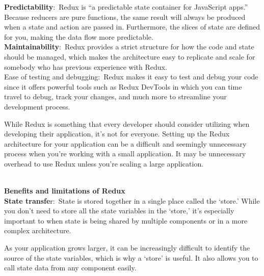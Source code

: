 \documentclass{article}
\begin{document}
\noindent \textbf{Predictability}:~Redux is ``a predictable state container for JavaScript apps.'' Because reducers are pure functions, the same result will always be produced when a state and action are passed in. Furthermore, the slices of state are defined for you, making the data flow more predictable. \\



\noindent \textbf{Maintainability}:~Redux provides a strict structure for how the code and state should be managed, which makes the architecture easy to replicate and scale for somebody who has previous experience with Redux.\\




\noindent Ease of testing and debugging:~Redux makes it easy to test and debug your code since it offers powerful tools such as Redux DevTools in which you can time travel to debug, track your changes, and much more to streamline your development process.\\


\noindent 

\noindent While Redux is something that every developer should consider utilizing when developing their application, it's not for everyone. Setting up the Redux architecture for your application can be a difficult and seemingly unnecessary process when you're working with a small application. It may be unnecessary overhead to use Redux unless you're scaling a large application.

\noindent 

\noindent 

\noindent 
\\
\textbf{Benefits and limitations of Redux}\\




\noindent \textbf{State transfe}r:~State is stored together in a single place called the `store.' While you don't need to store all the state variables in the `store,' it's especially important to when state is being shared by multiple components or in a more complex architecture.

\newpage

\noindent As your application grows larger, it can be increasingly difficult to identify the source of the state variables, which is why a `store' is useful. It also allows you to call state data from any component easily.\\
\end{document}
